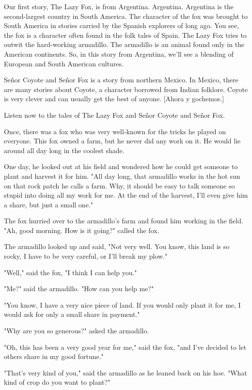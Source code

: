 Our first story, The Lazy Fox, is from Argentina. Argentina. Argentina is the second-largest country in South America. The character of the fox was brought to South America in stories carried by the Spanish explorers of long ago. You see, the fox is a character often found in the folk tales of Spain. The Lazy Fox tries to outwit the hard-working armadillo. The armadillo is an animal found only in the American continents. So, in this story from Argentina, we'll see a blending of European and South American cultures.

Señor Coyote and Señor Fox is a story from northern Mexico. In Mexico, there are many stories about Coyote, a character borrowed from Indian folklore. Coyote is very clever and can usually get the best of anyone. [Ahora y gochemos.]

Listen now to the tales of The Lazy Fox and Señor Coyote and Señor Fox.

Once, there was a fox who was very well-known for the tricks he played on everyone. This fox owned a farm, but he never did any work on it. He would lie around all day long in the coolest shade.

One day, he looked out at his field and wondered how he could get someone to plant and harvest it for him. "All day long, that armadillo works in the hot sun on that rock patch he calls a farm. Why, it should be easy to talk someone so stupid into doing all my work for me. At the end of the harvest, I'll even give him a share, but just a small one."

The fox hurried over to the armadillo's farm and found him working in the field. "Ah, good morning. How is it going?" called the fox.

The armadillo looked up and said, "Not very well. You know, this land is so rocky, I have to be very careful, or I'll break my plow."

"Well," said the fox, "I think I can help you."

"Me?" said the armadillo. "How can you help me?"

"You know, I have a very nice piece of land. If you would only plant it for me, I would ask for only a small share in payment."

"Why are you so generous?" asked the armadillo.

"Oh, this has been a very good year for me," said the fox, "and I've decided to let others share in my good fortune."

"That's very kind of you," said the armadillo as he leaned back on his hoe. "What kind of crop do you want to plant?"

